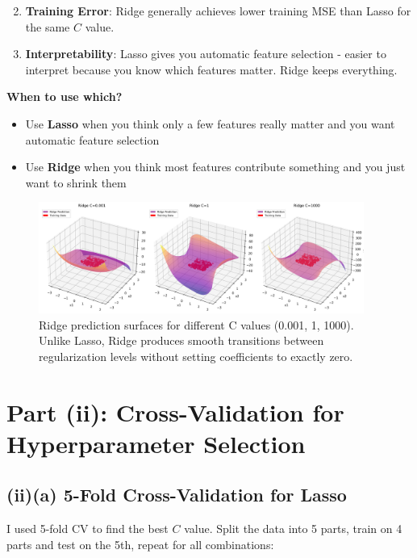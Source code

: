 \documentclass[11pt,a4paper]{article}
\begin{document}
\begin{enumerate}
    \setcounter{enumi}{1}
    \item \textbf{Training Error}: Ridge generally achieves lower training MSE than Lasso for the same $C$ value.
    
    \item \textbf{Interpretability}: Lasso gives you automatic feature selection - easier to interpret because you know which features matter. Ridge keeps everything.
\end{enumerate}

\textbf{When to use which?}

\begin{itemize}
    \item Use \textbf{Lasso} when you think only a few features really matter and you want automatic feature selection
    \item Use \textbf{Ridge} when you think most features contribute something and you just want to shrink them
\end{itemize}

\begin{figure}[H]
\centering
\includegraphics[width=0.95\textwidth]{figures/05_ridge_prediction_surfaces.png}
\caption{Ridge prediction surfaces for different C values (0.001, 1, 1000). Unlike Lasso, Ridge produces smooth transitions between regularization levels without setting coefficients to exactly zero.}
\label{fig:ridge_surfaces}
\end{figure}

\section*{Part (ii): Cross-Validation for Hyperparameter Selection}

\subsection*{(ii)(a) 5-Fold Cross-Validation for Lasso}

I used 5-fold CV to find the best $C$ value. Split the data into 5 parts, train on 4 parts and test on the 5th, repeat for all combinations:
\end{document}
